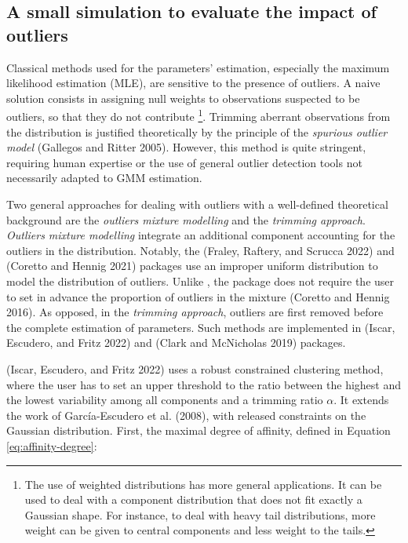 \hypertarget{a-small-simulation-to-evaluate-the-impact-of-outliers}{%
\subsection{A small simulation to evaluate the impact of outliers}\label{a-small-simulation-to-evaluate-the-impact-of-outliers}}

Classical methods used for the parameters' estimation, especially the
maximum likelihood estimation (MLE), are sensitive to the presence of
outliers. A naive solution consists in assigning null weights to
observations suspected to be outliers, so that they do not contribute
\footnote{The use of weighted distributions has more general applications.
  It can be used to deal with a component distribution that does not
  fit exactly a Gaussian shape. For instance, to deal with heavy tail
  distributions, more weight can be given to central components and
  less weight to the tails.}. Trimming aberrant observations from the distribution is justified
theoretically by the principle of the \emph{spurious outlier model}
(Gallegos and Ritter 2005). However, this method is quite stringent,
requiring human expertise or the use of general outlier detection tools
not necessarily adapted to GMM estimation.

Two general approaches for dealing with outliers with a well-defined
theoretical background are the \emph{outliers mixture modelling} and the
\emph{trimming approach}. \emph{Outliers mixture modelling} integrate an
additional component accounting for the outliers in the distribution.
Notably, the  (Fraley, Raftery, and Scrucca 2022) and  (Coretto and Hennig 2021)
packages use an improper uniform distribution to model the distribution
of outliers. Unlike , the  package does not
require the user to set in advance the proportion of outliers in the
mixture (Coretto and Hennig 2016). As opposed, in the \emph{trimming approach},
outliers are first removed before the complete estimation of parameters.
Such methods are implemented in  (Iscar, Escudero, and Fritz 2022) and
 (Clark and McNicholas 2019) packages.

 (Iscar, Escudero, and Fritz 2022) uses a robust constrained clustering
method, where the user has to set an upper threshold to the ratio
between the highest and the lowest variability among all components and
a trimming ratio \(\alpha\). It extends the work of
García-Escudero et al. (2008), with released constraints on the Gaussian
distribution. First, the maximal degree of affinity, defined in Equation
\eqref{eq:affinity-degree}:


